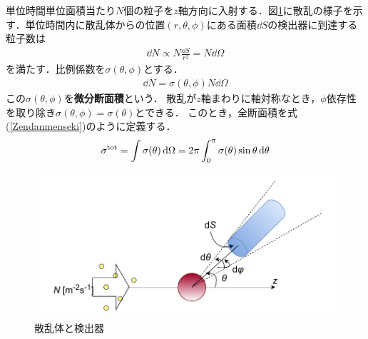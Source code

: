 \documentclass{report}
\begin{document}
単位時間単位面積当たり$N$個の粒子を$z$軸方向に入射する．図\ref{scattering_detection}に散乱の様子を示す．単位時間内に散乱体からの位置$(r,\theta,\phi)$にある面積$\dd{S}$の検出器に到達する粒子数は
\begin{align}
  \dd{N} \propto N \frac{\dd{S}}{r^2} = N\dd{\Omega}
\end{align}
を満たす．比例係数を$\sigma (\theta, \phi)$とする．
\begin{align}
  \dd{N} = \sigma(\theta, \phi) N \dd{\Omega}
\end{align}
この$\sigma(\theta ,\phi)$を\textbf{微分断面積}という．
散乱が$z$軸まわりに軸対称なとき，$\phi$依存性を取り除き$\sigma(\theta, \phi) = \sigma (\theta)$とできる．
このとき，全断面積を式(\ref{Zendanmenseki})のように定義する．
\begin{align}
  \sigma^{\mathrm{tot}} = \int \sigma(\theta) \dd{\Omega} = 2\pi \int_{0}^{\pi} \sigma(\theta) \sin \theta \dd{\theta}
\end{align}

\begin{figure}[htbp]
  \centering
  \includegraphics[width=0.6\columnwidth]{fig/scattering_diagram.pdf}
  \caption{散乱体と検出器}
  \label{scattering_detection}
\end{figure}
\end{document}
